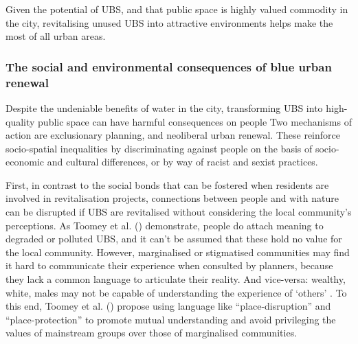 \documentclass{article}
\begin{document}
Given the potential of UBS, and that public space is highly valued commodity in the city, revitalising unused UBS into attractive environments helps make the most of all urban areas.
 
\subsubsection{The social and environmental consequences of blue urban renewal}

Despite the undeniable benefits of water in the city, transforming UBS into high-quality public space can have harmful consequences on people
Two mechanisms of action are exclusionary planning, and neoliberal urban renewal. These reinforce socio-spatial inequalities by discriminating against people on the basis of socio-economic and cultural differences, or by way of racist and sexist practices.

First, in contrast to the social bonds that can be fostered when residents are involved in revitalisation projects, connections between people and with nature can be disrupted if UBS are revitalised without considering the local community's perceptions. As Toomey et al. (\citeyear{toomey2021place}) demonstrate, people do attach meaning to degraded or polluted UBS, and it can't be assumed that these hold no value for the local community. 
However, marginalised or stigmatised communities may find it hard to communicate their experience when consulted by planners, because they lack a common language to articulate their reality. And vice-versa: wealthy, white, males may not be capable of understanding the experience of `others' \parencite{anguelovski2020expanding}. To this end, Toomey et al. (\citeyear{toomey2021place}) propose using language like ``place-disruption'' and ``place-protection'' to promote mutual understanding and avoid privileging the values of mainstream groups over those of marginalised communities.
\end{document}

